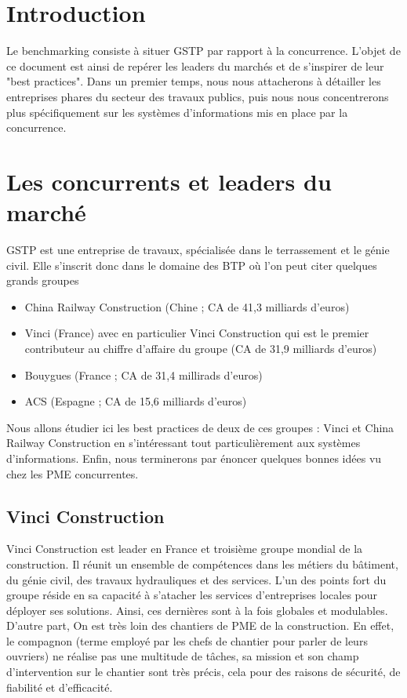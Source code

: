 \section{Introduction}

Le benchmarking consiste à situer GSTP par rapport à la concurrence. L'objet de ce document est ainsi de repérer les leaders du marchés et de s'inspirer de leur "best practices". 
Dans un premier temps, nous nous attacherons à détailler les entreprises phares du secteur des travaux publics, puis nous nous concentrerons plus spécifiquement sur les systèmes d'informations mis en place par la concurrence.

\section{Les concurrents et leaders du marché}
GSTP est une entreprise de travaux, spécialisée dans le terrassement et le génie civil.
Elle s'inscrit donc dans le domaine des BTP où l'on peut citer quelques grands groupes
\begin{itemize}
    \item China Railway Construction (Chine ; CA de 41,3 milliards d'euros)
	\item Vinci (France) avec en particulier Vinci Construction qui est le premier contributeur au chiffre d'affaire du groupe (CA de 31,9 milliards d'euros)
    \item Bouygues (France ; CA de 31,4 millirads d'euros)
    \item ACS (Espagne ; CA de 15,6 milliards d'euros)
\end{itemize}

Nous allons étudier ici les best practices de deux de ces groupes : Vinci et China Railway Construction en s'intéressant tout particulièrement aux systèmes d'informations. Enfin, nous terminerons par énoncer quelques bonnes idées vu chez les PME concurrentes.

\subsection{Vinci Construction}
Vinci Construction est leader en France et troisième groupe mondial de la construction.
Il réunit un ensemble de compétences dans les métiers du bâtiment, du génie civil, des travaux hydrauliques et des services.
L'un des points fort du groupe réside en sa capacité à s'atacher les services d'entreprises locales pour déployer ses solutions. Ainsi, ces dernières sont à la fois globales et modulables.
D'autre part, On est très loin des chantiers de PME de la construction. 
En effet, le compagnon (terme employé par les chefs de chantier pour parler de leurs ouvriers) ne réalise pas une multitude de tâches, sa mission et son champ d'intervention sur le chantier sont très précis, cela pour des raisons de sécurité, de fiabilité et d'efficacité.

